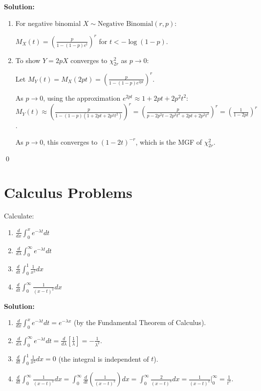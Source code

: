 \noindent\textbf{Solution:}
\begin{enumerate}[label=(\alph*)]
    \item For negative binomial $X \sim \text{Negative Binomial}(r,p)$:
    
    $M_X(t) = \left(\frac{p}{1-(1-p)e^t}\right)^r$ for $t < -\log(1-p)$.
    
    \item To show $Y = 2pX$ converges to $\chi^2_{2r}$ as $p \to 0$:
    
    Let $M_Y(t) = M_X(2pt) = \left(\frac{p}{1-(1-p)e^{2pt}}\right)^r$.
    
    As $p \to 0$, using the approximation $e^{2pt} \approx 1 + 2pt + 2p^2t^2$:
    $M_Y(t) \approx \left(\frac{p}{1-(1-p)(1+2pt+2p^2t^2)}\right)^r = \left(\frac{p}{p-2p^2t-2p^3t^2+2pt+2p^2t^2}\right)^r = \left(\frac{1}{1-2pt}\right)^r$.
    
    As $p \to 0$, this converges to $(1-2t)^{-r}$, which is the MGF of $\chi^2_{2r}$.
\end{enumerate}


\qed
\section{Calculus Problems}

\begin{problembox}
Calculate:
\begin{enumerate}[label=(\alph*)]
    \item $\frac{d}{dx}\int_0^x e^{-\lambda t}dt$
    \item $\frac{d}{d\lambda}\int_0^\infty e^{-\lambda t}dt$
    \item $\frac{d}{dt}\int_0^1 \frac{1}{x^2}dx$
    \item $\frac{d}{dt}\int_0^\infty \frac{1}{(x-t)^2}dx$
\end{enumerate}
\end{problembox}

\noindent\textbf{Solution:}
\begin{enumerate}[label=(\alph*)]
    \item $\frac{d}{dx}\int_0^x e^{-\lambda t}dt = e^{-\lambda x}$ (by the Fundamental Theorem of Calculus).
    
    \item $\frac{d}{d\lambda}\int_0^\infty e^{-\lambda t}dt = \frac{d}{d\lambda}\left[\frac{1}{\lambda}\right] = -\frac{1}{\lambda^2}$.
    
    \item $\frac{d}{dt}\int_0^1 \frac{1}{x^2}dx = 0$ (the integral is independent of $t$).
    
    \item $\frac{d}{dt}\int_0^\infty \frac{1}{(x-t)^2}dx = \int_0^\infty \frac{d}{dt}\left(\frac{1}{(x-t)^2}\right)dx = \int_0^\infty \frac{2}{(x-t)^3}dx = \frac{1}{(x-t)^2}|_0^\infty = \frac{1}{t^2}$.
\end{enumerate}


